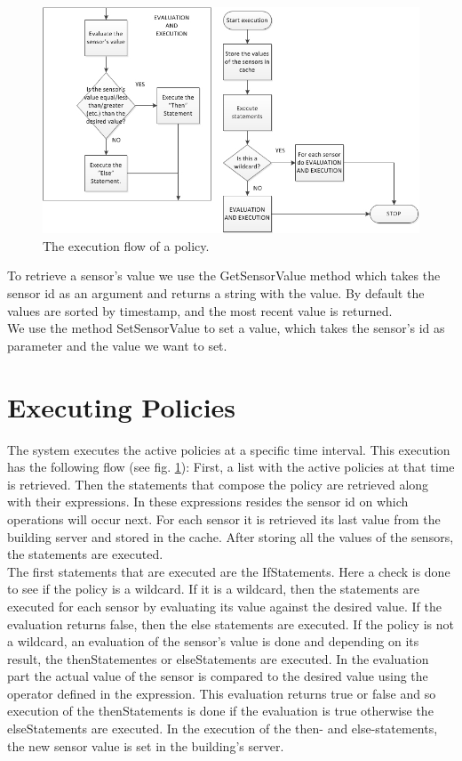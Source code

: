 \begin{figure}
	\centering
    \includegraphics[scale=0.65]{images/policy_execution_flow.png} 
	\caption{The execution flow of a policy.}
	\label{fig:policy_execution_workflow}
\end{figure}

To retrieve a sensor's value we use the GetSensorValue method which takes the sensor id as an argument and returns a string with the value. By default the values are sorted by timestamp, and the most recent value is returned.
\\We use the method SetSensorValue to set a value, which takes the sensor's id as parameter and the value we want to set. 

\section{Executing Policies} 
The system executes the active policies at a specific time interval. This execution has the following flow (see fig. \ref{fig:policy_execution_workflow}):
First, a list with the active policies at that time is retrieved. Then the statements that compose the policy are retrieved along with their expressions. In these expressions resides the sensor id on which operations will occur next. For each sensor it is retrieved its last value from the building server and stored in the cache. After storing all the values of the sensors, the statements are executed. 
\\The first statements that are executed are the IfStatements. Here a check is done to see if the policy is a wildcard. If it is a wildcard, then the statements are executed for each sensor by evaluating its value against the desired value. If the evaluation returns false, then the else statements are executed. If the policy is not a wildcard, an evaluation of the sensor's value is done and depending on its result, the thenStatementes or elseStatements are executed. 
In the evaluation part the actual value of the sensor is compared to the desired value using the operator defined in the expression. This evaluation returns true or false and so execution of the thenStatements is done if the evaluation is true otherwise the elseStatements are executed.
In the execution of the then- and else-statements, the new sensor value is set in the building's server. 